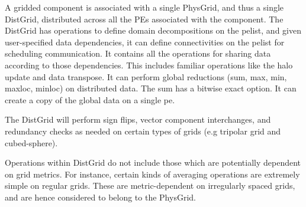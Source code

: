 A gridded component is associated with a single PhysGrid, and thus a
single DistGrid, distributed across all the PEs associated with the
component. The DistGrid has operations to define domain decompositions
on the pelist, and given user-specified data dependencies, it can
define connectivities on the pelist for scheduling communication. It
contains all the operations for sharing data according to those
dependencies. This includes familiar operations like the halo update
and data transpose. It can perform global reductions (sum, max,
min, maxloc, minloc) on distributed data. The sum has a bitwise exact
option. It can create a copy of the global data on a single pe.

The DistGrid will perform sign flips, vector component interchanges,
and redundancy checks as needed on certain types of grids (e.g
tripolar grid and cubed-sphere).

Operations within DistGrid do not include those which are potentially
dependent on grid metrics. For instance, certain kinds of averaging
operations are extremely simple on regular grids. These are
metric-dependent on irregularly spaced grids, and are hence considered
to belong to the PhysGrid.
